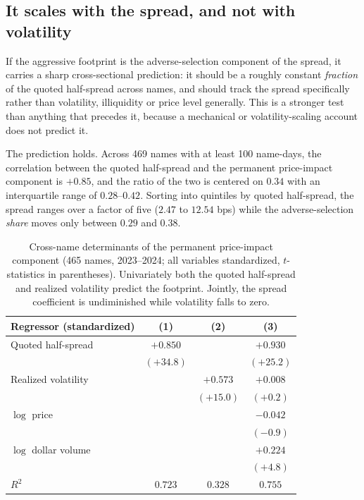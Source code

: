 \documentclass[11pt]{article}
\begin{document}
\subsection{It scales with the spread, and not with volatility}

If the aggressive footprint is the adverse-selection component of the spread, it carries a
sharp cross-sectional prediction: it should be a roughly constant \emph{fraction} of the
quoted half-spread across names, and should track the spread specifically rather than
volatility, illiquidity or price level generally. This is a stronger test than anything
that precedes it, because a mechanical or volatility-scaling account does not predict it.

The prediction holds. Across 469 names with at least 100 name-days, the correlation between
the quoted half-spread and the permanent price-impact component is $+0.85$, and the ratio of
the two is centered on $0.34$ with an interquartile range of $0.28$--$0.42$. Sorting into
quintiles by quoted half-spread, the spread ranges over a factor of five ($2.47$ to $12.54$
bps) while the adverse-selection \emph{share} moves only between $0.29$ and $0.38$.

\begin{table}[htbp]
\centering
\begin{tabular}{lccc}
\toprule
\textbf{Regressor (standardized)} & \textbf{(1)} & \textbf{(2)} & \textbf{(3)} \\
\midrule
Quoted half-spread & $+0.850$ & & $+0.930$ \\
                   & $(+34.8)$ & & $(+25.2)$ \\
Realized volatility & & $+0.573$ & $+0.008$ \\
                    & & $(+15.0)$ & $(+0.2)$ \\
$\log$ price & & & $-0.042$ \\
             & & & $(-0.9)$ \\
$\log$ dollar volume & & & $+0.224$ \\
                     & & & $(+4.8)$ \\
\midrule
$R^2$ & $0.723$ & $0.328$ & $0.755$ \\
\bottomrule
\end{tabular}
\caption{Cross-name determinants of the permanent price-impact component (465 names,
2023--2024; all variables standardized, $t$-statistics in parentheses). Univariately both
the quoted half-spread and realized volatility predict the footprint. Jointly, the spread
coefficient is undiminished while volatility falls to zero.}
\label{tab:scaling}
\end{table}
\end{document}
